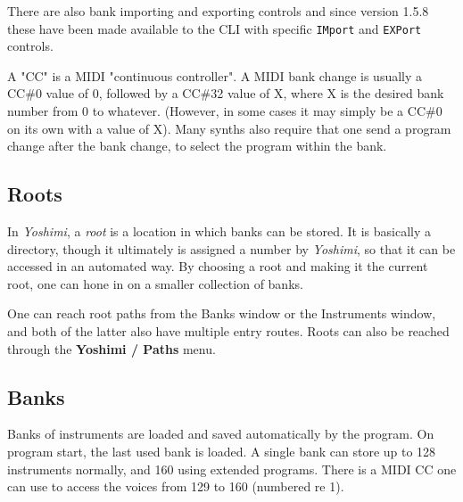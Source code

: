    There are also bank importing and exporting controls and since version 1.5.8
   these have been made available to the CLI with specific
   \texttt{IMport} and \texttt{EXPort} controls.

   A "CC" is a MIDI "continuous controller".
   A MIDI bank change is usually a CC\#0 value of 0, followed by a CC\#32
   value of X, where X is the desired bank number from 0 to whatever.
   (However, in some cases it may simply be a CC\#0 on its own with a value
    of X).  Many synths also require that one send a program change after
   the bank change, to select the program within the bank.

\subsection{Roots}
\label{subsec:banks_and_roots_roots}

   In \textsl{Yoshimi}, a \textsl{root} is a location in which banks can be
   stored.  It is basically a directory, though it ultimately is assigned a
   number by \textsl{Yoshimi}, so that it can be accessed in an automated
   way.  By choosing a root and making it the current root, one can hone in
   on a smaller collection of banks.

   One can reach root paths from the Banks window
   or the Instruments window,
   and both of the latter also have multiple entry routes.
   Roots can also be reached through the \textbf{Yoshimi / Paths} menu.

\subsection{Banks}
\label{subsec:banks_and_roots_banks}

   Banks of instruments are loaded and saved automatically by the program. On
   program start, the last used bank is loaded. A single bank can store up to
   128 instruments normally, and 160 using extended programs.
   There is a MIDI CC one can use to access the voices from 129 to 160
   (numbered re 1).


%


